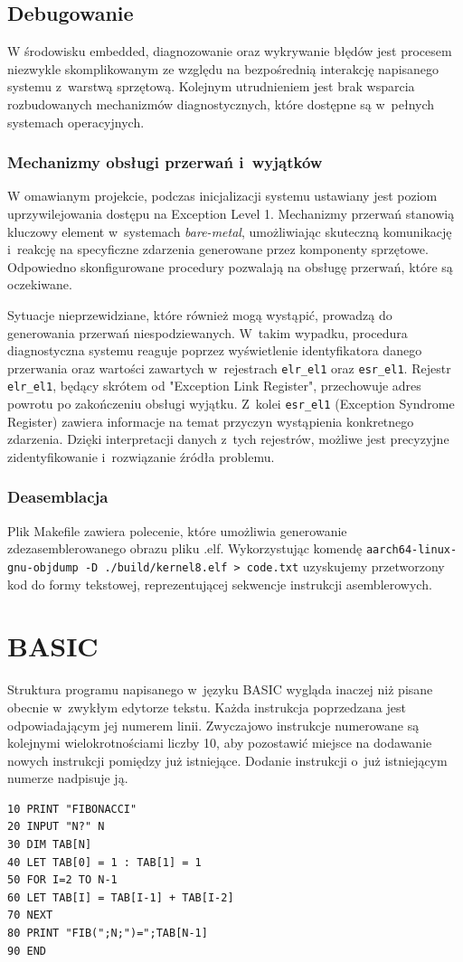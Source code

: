 \documentclass[shortabstract]{iithesis}
\begin{document}
\section{Debugowanie}
W środowisku embedded, diagnozowanie oraz wykrywanie błędów jest procesem niezwykle skomplikowanym ze względu na bezpośrednią interakcję napisanego systemu z~warstwą sprzętową. Kolejnym utrudnieniem jest brak wsparcia rozbudowanych mechanizmów diagnostycznych, które dostępne są w~pełnych systemach operacyjnych. 
\subsection{Mechanizmy obsługi przerwań i~wyjątków}
W omawianym projekcie, podczas inicjalizacji systemu ustawiany jest poziom uprzywilejowania dostępu na Exception Level 1. Mechanizmy przerwań stanowią kluczowy element w~systemach \textit{bare-metal}, umożliwiając skuteczną komunikację i~reakcję na specyficzne zdarzenia generowane przez komponenty sprzętowe. Odpowiedno skonfigurowane procedury pozwalają na obsługę przerwań, które są oczekiwane.

Sytuacje nieprzewidziane, które również mogą wystąpić, prowadzą do generowania przerwań niespodziewanych. W~takim wypadku, procedura diagnostyczna systemu reaguje poprzez wyświetlenie identyfikatora danego przerwania oraz wartości zawartych w~rejestrach \texttt{elr\_el1} oraz \texttt{esr\_el1}. Rejestr \texttt{elr\_el1}, będący skrótem od "Exception Link Register", przechowuje adres powrotu po zakończeniu obsługi wyjątku. Z~kolei \texttt{esr\_el1} (Exception Syndrome Register) zawiera informacje na temat przyczyn wystąpienia konkretnego zdarzenia. Dzięki interpretacji danych z~tych rejestrów, możliwe jest precyzyjne zidentyfikowanie i~rozwiązanie źródła problemu.
\subsection{Deasemblacja}
Plik Makefile zawiera polecenie, które umożliwia generowanie zdezasemblerowanego obrazu pliku .elf. Wykorzystując komendę \texttt{aarch64-linux-gnu-objdump -D ./build/kernel8.elf > code.txt} uzyskujemy przetworzony kod do formy tekstowej, reprezentującej sekwencje instrukcji asemblerowych.


\chapter{BASIC}
Struktura programu napisanego w~języku BASIC wygląda inaczej niż pisane obecnie w~zwykłym edytorze tekstu. Każda instrukcja poprzedzana jest odpowiadającym jej numerem linii. Zwyczajowo instrukcje numerowane są kolejnymi wielokrotnościami liczby 10, aby pozostawić miejsce na dodawanie nowych instrukcji pomiędzy już istniejące. Dodanie instrukcji o~już istniejącym numerze nadpisuje ją.
\begin{verbatim}
10 PRINT "FIBONACCI"
20 INPUT "N?" N
30 DIM TAB[N]
40 LET TAB[0] = 1 : TAB[1] = 1
50 FOR I=2 TO N-1
60 LET TAB[I] = TAB[I-1] + TAB[I-2]
70 NEXT
80 PRINT "FIB(";N;")=";TAB[N-1]
90 END
\end{verbatim}
\end{document}
